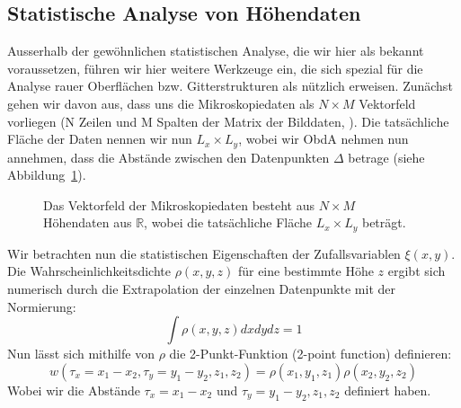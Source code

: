 \subsection{Statistische Analyse von Höhendaten}
\usetikzlibrary{decorations.pathreplacing}
Ausserhalb der gewöhnlichen statistischen Analyse, die wir
hier als bekannt voraussetzen, führen wir hier weitere Werkzeuge
ein, die sich spezial für die Analyse rauer Oberflächen bzw. 
Gitterstrukturen als nützlich erweisen\cite{gwyddion}. Zunächst
gehen wir davon aus, dass uns die Mikroskopiedaten als 
$N \times M$ Vektorfeld vorliegen (N Zeilen und M Spalten der
Matrix der Bilddaten, ). Die tatsächliche Fläche der Daten
nennen wir nun $L_x \times L_y$, wobei 
wir ObdA nehmen nun annehmen, dass die Abstände
zwischen den Datenpunkten $\Delta$ betrage 
(siehe Abbildung~\ref{fig:stat1}). 

\begin{figure}
\caption{Das Vektorfeld der Mikroskopiedaten besteht aus 
$N \times M$ Höhendaten aus $\mathbb{R}$, wobei die tatsächliche 
Fläche $L_x \times L_y$ beträgt.}
\label{fig:stat1}
\end{figure}
Wir betrachten nun 
die statistischen Eigenschaften der Zufallsvariablen $\xi(x,y)$. 
Die Wahrscheinlichkeitsdichte $\rho(x,y,z)$ für eine 
bestimmte Höhe $z$ ergibt sich numerisch
durch die Extrapolation der einzelnen Datenpunkte mit der Normierung:
\begin{equation*}
\int \rho(x,y,z) dx dy dz = 1
\end{equation*}
Nun lässt sich mithilfe von $\rho$ die 2-Punkt-Funktion
(2-point function) definieren:
\begin{equation}
w(\tau_x=x_1-x_2, \tau_y=y_1-y_2,z_1,z_2) = \rho(x_1,y_1,z_1)
\rho(x_2,y_2,z_2)
\end{equation}
Wobei wir die Abstände $\tau_x=x_1-x_2$ und $\tau_y=y_1-y_2,z_1,z_2$
definiert haben.
